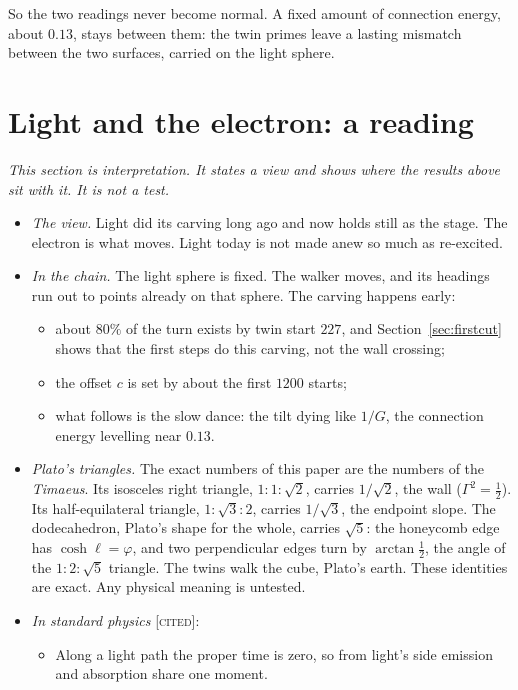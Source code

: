 \documentclass[11pt]{article}
\theoremstyle{definition}
\theoremstyle{remark}
\newcommand{\grade}[1]{\textsc{[#1]}}
\begin{document}
So the two readings never become normal. A fixed amount of connection energy, about $0.13$, stays between them: the twin primes leave a lasting mismatch between the two surfaces, carried on the light sphere.

\section{Light and the electron: a reading}

\noindent\emph{This section is interpretation. It states a view and shows where the results above sit with it. It is not a test.}

\begin{itemize}
\item \emph{The view.} Light did its carving long ago and now holds still as the stage. The electron is what moves. Light today is not made anew so much as re-excited.
\item \emph{In the chain.} The light sphere is fixed. The walker moves, and its headings run out to points already on that sphere. The carving happens early:
  \begin{itemize}
  \item about $80\%$ of the turn exists by twin start $227$, and Section~\ref{sec:firstcut} shows that the first steps do this carving, not the wall crossing;
  \item the offset $c$ is set by about the first $1200$ starts;
  \item what follows is the slow dance: the tilt dying like $1/G$, the connection energy levelling near $0.13$.
  \end{itemize}
\item \emph{Plato's triangles.} The exact numbers of this paper are the numbers of the \emph{Timaeus}. Its isosceles right triangle, $1:1:\sqrt2$, carries $1/\sqrt2$, the wall ($\Gamma^2=\tfrac12$). Its half-equilateral triangle, $1:\sqrt3:2$, carries $1/\sqrt3$, the endpoint slope. The dodecahedron, Plato's shape for the whole, carries $\sqrt5$: the honeycomb edge has $\cosh\ell=\varphi$, and two perpendicular edges turn by $\arctan\tfrac12$, the angle of the $1:2:\sqrt5$ triangle. The twins walk the cube, Plato's earth. These identities are exact. Any physical meaning is untested.
\item \emph{In standard physics} \grade{cited}:
  \begin{itemize}
  \item Along a light path the proper time is zero, so from light's side emission and absorption share one moment.

\end{itemize}
\end{itemize}
\end{document}
